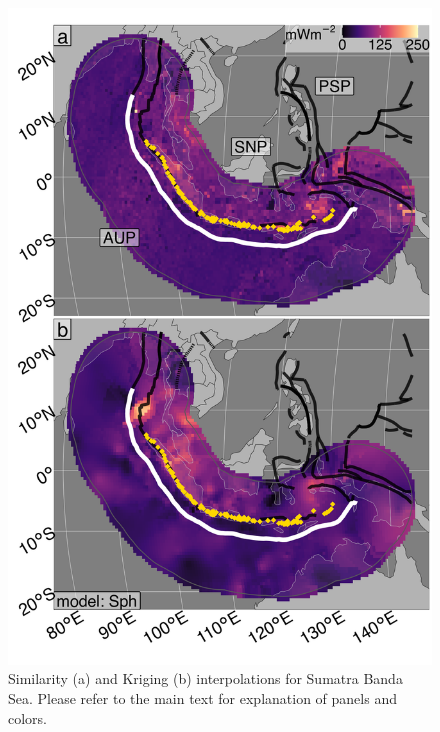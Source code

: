 \begin{figure}[htbp]

{\centering \includegraphics[width=1\linewidth,]{assets/figs/chpt3/SumatraBandaSeaDiffComp} 

}

\caption[Similarityand Kriging interpolations for Sumatra Banda Sea]{Similarity (a) and Kriging (b) interpolations for Sumatra Banda Sea. Please refer to the main text for explanation of panels and colors.}\label{fig:sumatraBandaSeaDiff}
\end{figure}

